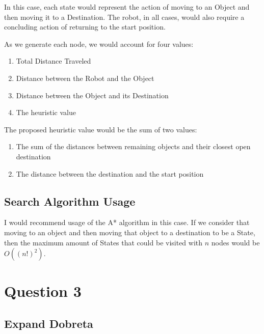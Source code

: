 \documentclass[12pt]{article}
\begin{document}
In this case, each state would represent the action of moving to an Object and then moving it to a Destination.
The robot, in all cases, would also require a concluding action of returning to the start position.

As we generate each node, we would account for four values:

\begin{enumerate}
    \item Total Distance Traveled
    \item Distance between the Robot and the Object
    \item Distance between the Object and its Destination
    \item The heuristic value
\end{enumerate}

The proposed heuristic value would be the sum of two values:

\begin{enumerate}
    \item The sum of the distances between remaining objects and their closest open destination
    \item The distance between the destination and the start position
\end{enumerate}

\subsection{Search Algorithm Usage}

I would recommend usage of the A* algorithm in this case.
If we consider that moving to an object and then moving that object to a destination to be a State, 
then the maximum amount of States that could be visited with $n$ nodes would be $O((n!)^2)$.


\pagebreak

\section{Question 3}

\subsection{Expand Dobreta}

\begin{center}
\end{center}
\end{document}
